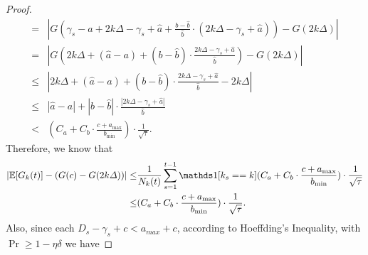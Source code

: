 \begin{proof}
\begin{equation}
\begin{aligned}
            =&|G(\gamma_s-a+2k\Delta-\gamma_s+\hat a +\frac{b-\hat b}{\hat b}\cdot(2k\Delta-\gamma_s+\hat a)) - G(2k\Delta)|\\
            =&|G(2k\Delta + (\hat a - a) + (b-\hat b)\cdot\frac{2k\Delta-\gamma_s+\hat a}{\hat b}) - G(2k\Delta)|\\
            \leq&|2k\Delta + (\hat a - a) + (b-\hat b)\cdot\frac{2k\Delta-\gamma_s+\hat a}{\hat b}-2k\Delta|\\
            \leq&|\hat a-a| + |b-\hat b|\cdot\frac{|2k\Delta-\gamma_s+\hat a|}{\hat b}\\
            <&(C_a + C_b\cdot\frac{c+a_{\max}}{b_{\min}})\cdot\frac1{\sqrt{\tau}}.
        \end{aligned}
    \end{equation}
    Therefore, we know that
    \begin{equation}
        \label{eq:g_k_bias}
        \begin{aligned}
            |\E[G_k(t)]-(G(c)-G(2k\Delta))|\leq&\frac1{N_k(t)}\sum_{s=1}^{t-1}\ind[k_s==k](C_a+C_b\cdot\frac{c+a_{\max}}{b_{\min}})\cdot\frac1{\sqrt{\tau}}\\
            \leq&(C_a+C_b\cdot\frac{c+a_{\max}}{b_{\min}})\cdot\frac1{\sqrt{\tau}}.
        \end{aligned}
    \end{equation}
    Also, since each $D_s-\gamma_s + c < a_{max} + c$, according to Hoeffding's Inequality, with $\Pr\geq 1- \eta\delta$ we have
    

\end{proof}
